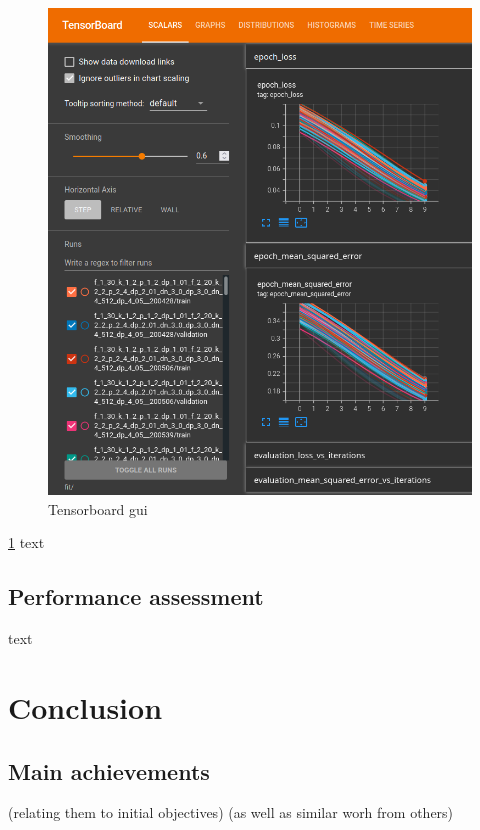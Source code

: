 \documentclass[
11pt,
twoside
]{report}
\begin{document}
\begin{figure}[H]
    \includegraphics[keepaspectratio, width=\columnwidth]{Screenshot_2022-04-17_23-06-29.png}
    \caption{Tensorboard gui}
    \label{img:tensorboard_gui}
\end{figure}

\ref{img:tensorboard_gui} text


\section{Performance assessment}


text



\chapter{Conclusion}



\section{Main achievements}

    (relating them to initial objectives)
    (as well as similar worh from others)
\end{document}
